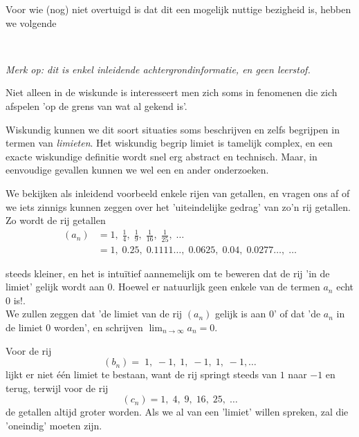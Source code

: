 \documentclass{ximera}
\begin{document}
\begin{expandable}
Voor wie (nog) niet overtuigd is dat dit een mogelijk nuttige bezigheid is, hebben we volgende%


\begin{uitweiding} \ 
	
\textit{Merk op: dit is enkel inleidende achtergrondinformatie, en geen leerstof.
}

Niet alleen in de wiskunde is interesseert men zich soms in fenomenen die zich afspelen 'op de grens van wat al gekend is'. %

Wiskundig kunnen we dit soort situaties soms beschrijven en zelfs begrijpen in termen van \textit{limieten}. Het wiskundig begrip limiet is tamelijk complex, en een exacte wiskundige definitie wordt snel erg abstract en technisch. Maar, in eenvoudige gevallen kunnen we wel een en ander onderzoeken.

We bekijken als inleidend voorbeeld enkele rijen van getallen, en vragen ons af of we iets zinnigs kunnen zeggen over het 'uiteindelijke gedrag' van zo'n rij getallen. Zo wordt de rij getallen
\begin{align*}
(a_n) & = 1, \;\frac{1}{4}, \;\frac{1}{9}, \;\frac{1}{16},\;\frac{1}{25},\;\dots\\
                                & =1,\; 0.25,\;  0.1111\dots,\; 0.0625,\; 0.04,\; 0.0277\dots,\; \dots
\end{align*}

steeds kleiner, en het is intuïtief aannemelijk om te beweren dat de rij 'in de limiet' gelijk wordt aan $0$. Hoewel er natuurlijk geen enkele van de termen $a_n$ echt $0$ is!. \\
We zullen zeggen dat 'de limiet van de rij $(a_n)$ gelijk is aan $0$' of dat 'de $a_n$ in de limiet $0$ worden', en schrijven $\lim_{n\to\infty}a_n = 0$.

Voor de rij 
\[
(b_n) = \;1,\;-1,\;1,\;-1,\;1,\;-1,\dots
\]
lijkt er niet één limiet te bestaan, want de rij springt steeds van $1$ naar $-1$ en terug, 
terwijl voor de rij 
\[
(c_n) = 1,\;4,\;9,\;16,\;25,\;\dots
\]
de getallen altijd groter worden. Als we al van een 'limiet' willen spreken, zal die 'oneindig' moeten zijn.


\end{uitweiding}
\end{expandable}
\end{document}
